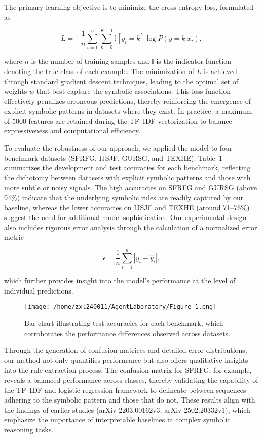 \documentclass{article}
\begin{document}
The primary learning objective is to minimize the cross-entropy loss, formulated as

\[
L = -\frac{1}{n}\sum_{i=1}^{n} \sum_{k=0}^{K-1} \mathbb{I}[y_i=k] \log P(y=k|x_i),
\]

where \(n\) is the number of training samples and \(\mathbb{I}\) is the indicator function denoting the true class of each example. The minimization of \(L\) is achieved through standard gradient descent techniques, leading to the optimal set of weights \(w\) that best capture the symbolic associations. This loss function effectively penalizes erroneous predictions, thereby reinforcing the emergence of explicit symbolic patterns in datasets where they exist. In practice, a maximum of 5000 features are retained during the TF–IDF vectorization to balance expressiveness and computational efficiency.

To evaluate the robustness of our approach, we applied the model to four benchmark datasets (SFRFG, IJSJF, GURSG, and TEXHE). Table~\(1\) summarizes the development and test accuracies for each benchmark, reflecting the dichotomy between datasets with explicit symbolic patterns and those with more subtle or noisy signals. The high accuracies on SFRFG and GURSG (above 94\%) indicate that the underlying symbolic rules are readily captured by our baseline, whereas the lower accuracies on IJSJF and TEXHE (around 71--76\%) suggest the need for additional model sophistication. Our experimental design also includes rigorous error analysis through the calculation of a normalized error metric

\[
\epsilon = \frac{1}{n}\sum_{i=1}^{n} \left|y_i - \hat{y}_i\right|,
\]

which further provides insight into the model’s performance at the level of individual predictions.

\begin{figure}[h]
\caption{Bar chart illustrating test accuracies for each benchmark, which corroborates the performance differences observed across datasets.}
\centering
\texttt{[image: /home/zxl240011/AgentLaboratory/Figure\_1.png]}
\label{fig:fig1}
\end{figure}

Through the generation of confusion matrices and detailed error distributions, our method not only quantifies performance but also offers qualitative insights into the rule extraction process. The confusion matrix for SFRFG, for example, reveals a balanced performance across classes, thereby validating the capability of the TF–IDF and logistic regression framework to delineate between sequences adhering to the symbolic pattern and those that do not. These results align with the findings of earlier studies (arXiv 2203.00162v3, arXiv 2502.20332v1), which emphasize the importance of interpretable baselines in complex symbolic reasoning tasks.
\end{document}
